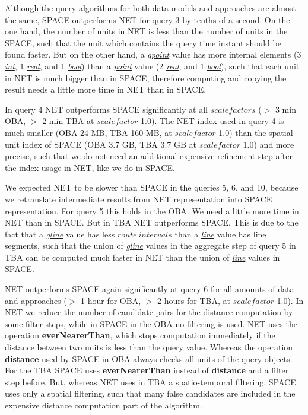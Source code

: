 \documentclass[a4paper]{article}
\newcommand{\op}[1]{\textbf{#1}}
\newcommand{\dt}[1]{\textsl{\underline{#1}}}
\begin{document}
Although the query algorithms for both data models and approaches are almost the same,
SPACE outperforms NET for query 3 by tenths of a second. On the one hand, the
number of units in NET is less than the number of units in the SPACE,
such that the unit which contains the query time instant should be found faster.
But on the other hand, a \dt{gpoint} value has more internal elements (3 \dt{int},
1 \dt{real}, and 1 \dt{bool}) than a \dt{point} value (2 \dt{real}, and 1 \dt{bool}),
such that each unit in NET is much bigger than in SPACE, therefore computing and
copying the result needs a little more time in NET than in SPACE.

In query 4 NET outperforms SPACE significantly at all $scalefactors$ ($>$ 3 min OBA,
$>$ 2 min TBA at $scalefactor$ 1.0).
The NET index used in query 4 is much smaller (OBA 24 MB, TBA 160 MB, at $scalefactor$ 1.0)
than the spatial unit index of SPACE (OBA 3.7 GB, TBA 3.7 GB at $scalefactor$ 1.0)
and more precise, such that we do not need an additional expensive refinement step after the
index usage in NET, like we do in SPACE.

We expected NET to be slower than SPACE in the queries 5, 6, and 10, because
we retranslate intermediate results from NET representation into SPACE representation.
For query 5 this holds in the OBA. We need a little more time in NET
than in SPACE. But in TBA NET outperforms SPACE. This is due to the fact
that a \dt{gline} value has less $route\ intervals$
than a \dt{line} value has line segments,
such that the union of \dt{gline} values in the aggregate step of query 5 in
TBA can be computed much faster in NET than the union of \dt{line} values in SPACE.

NET outperforms SPACE again significantly at query 6
for all amounts of data and approaches ($>$ 1 hour for OBA, $>$
2 hours for TBA, at $scalefactor$ 1.0). In NET we reduce the number of candidate
pairs for the distance computation by some filter steps, while in SPACE
in the OBA no filtering is used. NET uses the operation \op{everNearerThan}, which
stops computation immediately if the distance between two units is less than the
query value. Whereas the operation \op{distance} used by SPACE in OBA always checks
all units of the query objects. For the TBA SPACE uses \op{everNearerThan}
instead of \op{distance} and a filter step before. But, whereas NET uses in TBA
a spatio-temporal filtering, SPACE uses only a spatial filtering, such that many
false candidates are included in the expensive distance computation part of the
algorithm.
\end{document}
